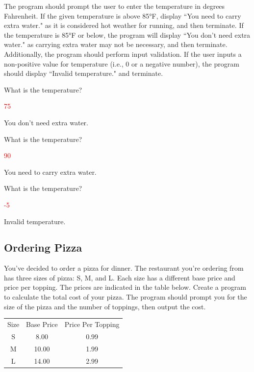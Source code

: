 The program should prompt the user to enter the temperature in degrees Fahrenheit. If the given temperature is above 85°F, display ``You need to carry extra water." as it is considered hot weather for running, and then terminate. If the temperature is 85°F or below, the program will display ``You don't need extra water." as carrying extra water may not be necessary, and then terminate.\\

Additionally, the program should perform input validation. If the user inputs a non-positive value for temperature (i.e., 0 or a negative number), the program should display ``Invalid temperature." and terminate.

\begin{sample} What is the temperature?

\textcolor{red}{75}

You don't need extra water. \end{sample}

\begin{sample} What is the temperature?

\textcolor{red}{90}

You need to carry extra water. \end{sample}

\begin{sample} What is the temperature?

\textcolor{red}{-5}

Invalid temperature. \end{sample}

\subsection{Ordering Pizza}
You've decided to order a pizza for dinner. The restaurant you're ordering from has three sizes of pizza: S, M, and L. Each size has a different base price and price per topping. The prices are indicated in the table below. Create a program to calculate the total cost of your pizza. The program should prompt you for the size of the pizza and the number of toppings, then output the cost. 

\begin{table}[H]
    \centering
    \begin{tabular}{c|c|c}
        Size & Base Price & Price Per Topping \\
        S & 8.00 & 0.99 \\
        M & 10.00 & 1.99 \\
        L & 14.00 & 2.99
    \end{tabular}
\end{table}

